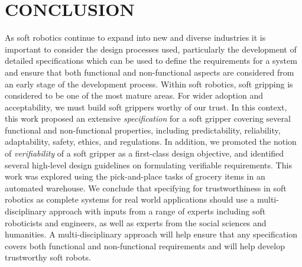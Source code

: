 \documentclass[letterpaper, 10 pt, conference]{ieeeconf}  %
\begin{document}
\section{CONCLUSION} \label{summary-conclusions}%
	As soft robotics continue to expand into new and diverse industries it is important to consider the design processes used, particularly the development of detailed specifications which can be used to define the requirements for a system and ensure that both functional and non-functional aspects are considered from an early stage of the development process.
	Within soft robotics, soft gripping is considered to be one of the most mature areas. 
	For wider adoption and acceptability, we must build soft grippers worthy of our trust. 
	In this context, this work proposed an extensive \emph{specification} for a soft gripper covering several functional and non-functional properties, including predictability, reliability, adaptability, safety, ethics, and regulations.
	In addition, we promoted the notion of \emph{verifiability} of a soft gripper as a first-class design objective, and identified several high-level design guidelines on formulating verifiable requirements. 
	This work was explored using the pick-and-place tasks of grocery items in an automated warehouse. 
 We conclude that specifying for trustworthiness in soft robotics as complete systems for real world applications should use a multi-disciplinary approach with inputs from a range of experts including soft roboticists and engineers, as well as experts from the social sciences and humanities.  A multi-disciplinary approach will help ensure that any specification covers both functional and non-functional requirements and will help develop trustworthy soft robots.
 
	
	\addtolength{\textheight}{-12cm}   %
	
\end{document}
